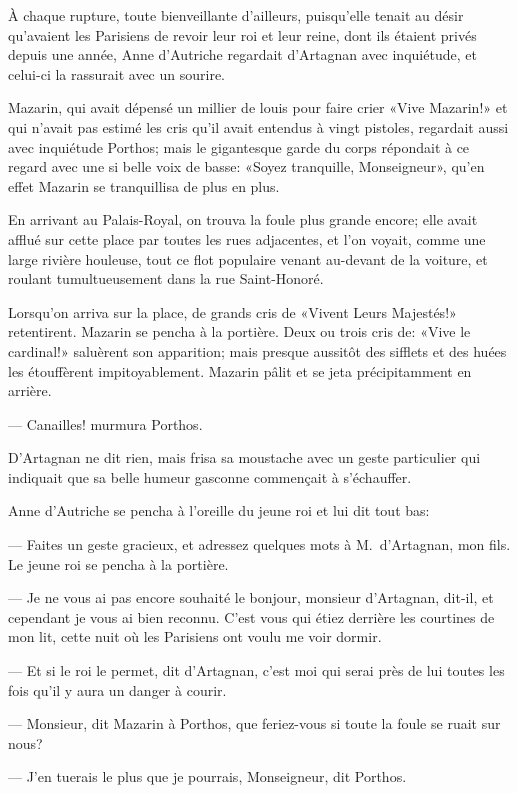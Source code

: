 À chaque rupture, toute bienveillante d'ailleurs, puisqu'elle tenait au désir qu'avaient les Parisiens de revoir leur roi et leur reine, dont ils étaient privés depuis une année, Anne d'Autriche regardait d'Artagnan avec inquiétude, et celui-ci la rassurait avec un sourire.

Mazarin, qui avait dépensé un millier de louis pour faire crier «Vive Mazarin!» et qui n'avait pas estimé les cris qu'il avait entendus à vingt pistoles, regardait aussi avec inquiétude Porthos; mais le gigantesque garde du corps répondait à ce regard avec une si belle voix de basse: «Soyez tranquille, Monseigneur», qu'en effet Mazarin se tranquillisa de plus en plus.

En arrivant au Palais-Royal, on trouva la foule plus grande encore; elle avait afflué sur cette place par toutes les rues adjacentes, et l'on voyait, comme une large rivière houleuse, tout ce flot populaire venant au-devant de la voiture, et roulant tumultueusement dans la rue Saint-Honoré.

Lorsqu'on arriva sur la place, de grands cris de «Vivent Leurs Majestés!» retentirent. Mazarin se pencha à la portière. Deux ou trois cris de: «Vive le cardinal!» saluèrent son apparition; mais presque aussitôt des sifflets et des huées les étouffèrent impitoyablement. Mazarin pâlit et se jeta précipitamment en arrière.

— Canailles! murmura Porthos.

D'Artagnan ne dit rien, mais frisa sa moustache avec un geste particulier qui indiquait que sa belle humeur gasconne commençait à s'échauffer.

Anne d'Autriche se pencha à l'oreille du jeune roi et lui dit tout bas:

— Faites un geste gracieux, et adressez quelques mots à M.~d'Artagnan, mon fils.
Le jeune roi se pencha à la portière.

— Je ne vous ai pas encore souhaité le bonjour, monsieur d'Artagnan, dit-il, et cependant je vous ai bien reconnu. C'est vous qui étiez derrière les courtines de mon lit, cette nuit où les Parisiens ont voulu me voir dormir.

— Et si le roi le permet, dit d'Artagnan, c'est moi qui serai près de lui toutes les fois qu'il y aura un danger à courir.

— Monsieur, dit Mazarin à Porthos, que feriez-vous si toute la foule se ruait sur nous?

— J'en tuerais le plus que je pourrais, Monseigneur, dit Porthos.

